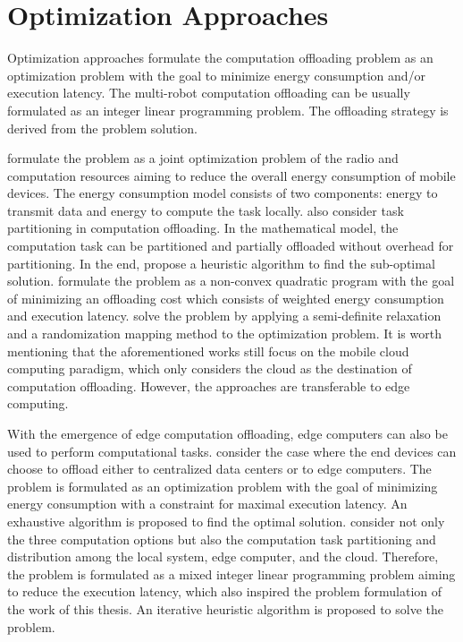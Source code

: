 \section{Optimization Approaches}\label{sec:optimization_approaches}

Optimization approaches formulate the computation offloading problem as an optimization problem with the goal to minimize energy consumption and/or execution latency. The multi-robot computation offloading can be usually formulated as an integer linear programming problem. The offloading strategy is derived from the problem solution. 

\citeauthor*{Zhao2015} \cite{Zhao2015} formulate the problem as a joint optimization problem of the radio and computation resources aiming to reduce the overall energy consumption of mobile devices. The energy consumption model consists of two components: energy to transmit data and energy to compute the task locally. \citeauthor*{Zhao2015} also consider task partitioning in computation offloading. In the mathematical model, the computation task can be partitioned and partially offloaded without overhead for partitioning. In the end, \citeauthor*{Zhao2015} propose a heuristic algorithm to find the sub-optimal solution. \citeauthor*{Chen2015} \cite{Chen2015} formulate the problem as a non-convex quadratic program with the goal of minimizing an offloading cost which consists of weighted energy consumption and execution latency. \citeauthor*{Chen2015} solve the problem by applying a semi-definite relaxation and a randomization mapping method to the optimization problem. It is worth mentioning that the aforementioned works still focus on the mobile cloud computing paradigm, which only considers the cloud as the destination of computation offloading. However, the approaches are transferable to edge computing. 

With the emergence of edge computation offloading, edge computers can also be used to perform computational tasks. \citeauthor*{Guo2018} \cite{Guo2018} consider the case where the end devices can choose to offload either to centralized data centers or to edge computers. The problem is formulated as an optimization problem with the goal of minimizing energy consumption with a constraint for maximal execution latency. An exhaustive algorithm is proposed to find the optimal solution. \citeauthor*{Ning2019} \cite{Ning2019} consider not only the three computation options but also the computation task partitioning and distribution among the local system, edge computer, and the cloud. Therefore, the problem is formulated as a mixed integer linear programming problem aiming to reduce the execution latency, which also inspired the problem formulation of the work of this thesis. An iterative heuristic algorithm is proposed to solve the problem. 

